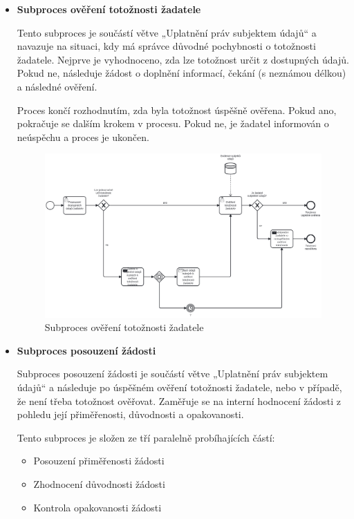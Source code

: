 \begin{itemize}
  \item \textbf{Subproces ověření totožnosti žadatele}
  
  Tento subproces je součástí větve „Uplatnění práv subjektem údajů“ a navazuje na situaci, kdy má správce důvodné pochybnosti o totožnosti žadatele. Nejprve je vyhodnoceno, zda lze totožnost určit z dostupných údajů. Pokud ne, následuje žádost o doplnění informací, čekání (s neznámou délkou) a následné ověření.

  Proces končí rozhodnutím, zda byla totožnost úspěšně ověřena. Pokud ano, pokračuje se dalším krokem v procesu. Pokud ne, je žadatel informován o neúspěchu a proces je ukončen.

  \begin{figure}[H]
    \centering
    \includegraphics[width=\textwidth]{images/BPMN_zadost_totoznost.png}
    \caption{Subproces ověření totožnosti žadatele}
    \label{fig:bpmn_totoznost}
  \end{figure}

  \item \textbf{Subproces posouzení žádosti}
  
  Subproces posouzení žádosti je součástí větve „Uplatnění práv subjektem údajů“ a následuje po úspěšném ověření totožnosti žadatele, nebo v případě, že není třeba totožnost ověřovat. Zaměřuje se na interní hodnocení žádosti z pohledu její přiměřenosti, důvodnosti a opakovanosti.

  Tento subproces je složen ze tří paralelně probíhajících částí:
  \begin{itemize}
    \item Posouzení přiměřenosti žádosti
    \item Zhodnocení důvodnosti žádosti
    \item Kontrola opakovanosti žádosti
  \end{itemize}


\end{itemize}
